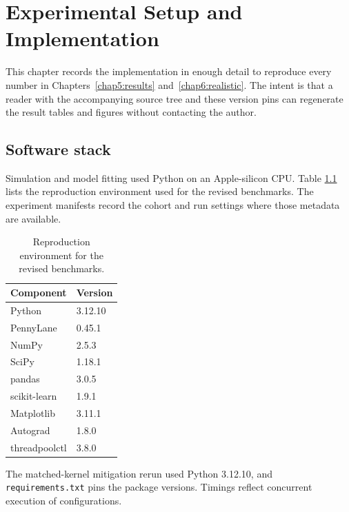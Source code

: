 \documentclass[Thesis.tex]{subfiles}
\begin{document}
\setcounter{chapter}{3} %



\chapter{Experimental Setup and Implementation}\label{chap4:setup}

This chapter records the implementation in enough detail to reproduce every number
in Chapters~\ref{chap5:results} and~\ref{chap6:realistic}. The intent is that a
reader with the accompanying source tree and these version pins can regenerate the
result tables and figures without contacting the author.

\section{Software stack}

Simulation and model fitting used Python on an Apple-silicon CPU. Table
\ref{tab:ch4_stack} lists the reproduction environment used for the revised
benchmarks. The experiment manifests record the cohort and run settings where
those metadata are available.

\begin{table}[htbp]
\centering
\caption[Software versions]{Reproduction environment for the revised benchmarks.}
\label{tab:ch4_stack}
\begin{tabular}{ll}
\toprule
\textbf{Component} & \textbf{Version} \\
\midrule
Python            & 3.12.10 \\
PennyLane         & 0.45.1 \\
NumPy             & 2.5.3 \\
SciPy             & 1.18.1 \\
pandas            & 3.0.5 \\
scikit-learn      & 1.9.1 \\
Matplotlib        & 3.11.1 \\
Autograd          & 1.8.0 \\
threadpoolctl     & 3.8.0 \\
\bottomrule
\end{tabular}
\end{table}

The matched-kernel mitigation rerun used Python 3.12.10, and \texttt{requirements.txt}
pins the package versions. Timings reflect concurrent execution of configurations.
\end{document}
